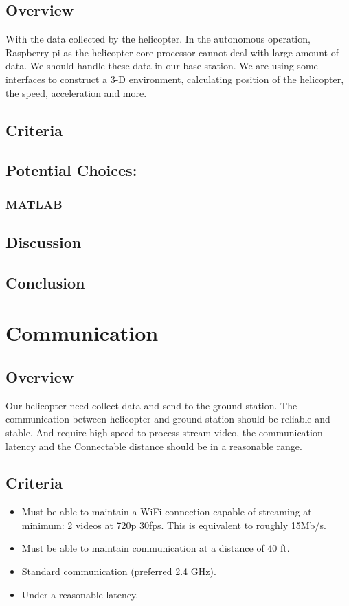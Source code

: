 \documentclass[letterpaper, 10, draftclsnofoot, onecolumn]{IEEEtran}
\begin{document}
\subsection{Overview}
With the data collected by the helicopter. In the autonomous operation, Raspberry pi as the helicopter core processor cannot deal with large amount of data. We should handle these data in our base station. We are using some interfaces to construct a 3-D environment, calculating position of the helicopter, the speed, acceleration and more.
\subsection{Criteria}

\subsection{Potential Choices:}
\subsubsection{MATLAB}

\subsection{Discussion}

\subsection{Conclusion}



\section{Communication}
\subsection{Overview}
Our helicopter need collect data and send to the ground station. The communication between helicopter and ground station should be reliable and stable. And require high speed to process stream video, the communication latency and the Connectable distance should be in a reasonable range.
\subsection{Criteria}
\begin{itemize} 
\item 	Must be able to maintain a WiFi connection capable of streaming at minimum: 2 videos at 720p 30fps. This is equivalent to roughly 15Mb/s.
\item 	Must be able to maintain communication at a distance of 40 ft.
\item 	Standard communication (preferred 2.4 GHz).
\item  Under a reasonable latency.

\end{itemize}
\end{document}
